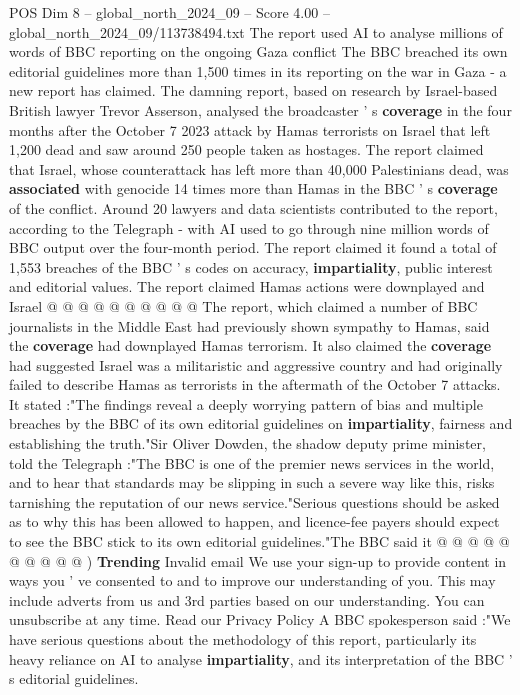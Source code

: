 \begin{textsample}{POS Dim 8 – global\_north\_2024\_09 – Score 4.00 – global\_north\_2024\_09/113738494.txt}  \label{ex:f8_pos_293}
The report used AI to analyse millions of words of BBC reporting on the ongoing Gaza conflict The BBC breached its own editorial guidelines more than 1,500 times in its reporting on the war in Gaza - a new report has claimed.
The damning report, based on research by Israel-based British lawyer Trevor Asserson, analysed the broadcaster ' s \textbf{coverage} in the four months after the October 7 2023 attack by Hamas terrorists on Israel that left 1,200 dead and saw around 250 people taken as hostages.
The report claimed that Israel, whose counterattack has left more than 40,000 Palestinians dead, was \textbf{associated} with genocide 14 times more than Hamas in the BBC ' s \textbf{coverage} of the conflict.
Around 20 lawyers and data scientists contributed to the report, according to the Telegraph - with AI used to go through nine million words of BBC output over the four-month period.
The report claimed it found a total of 1,553 breaches of the BBC ' s codes on accuracy, \textbf{impartiality}, public interest and editorial values.
The report claimed Hamas actions were downplayed and Israel @ @ @ @ @ @ @ @ @ @ The report, which claimed a number of BBC journalists in the Middle East had previously shown sympathy to Hamas, said the \textbf{coverage} had downplayed Hamas terrorism.
It also claimed the \textbf{coverage} had suggested Israel was a militaristic and aggressive country and had originally failed to describe Hamas as terrorists in the aftermath of the October 7 attacks.
It stated :"The findings reveal a deeply worrying pattern of bias and multiple breaches by the BBC of its own editorial guidelines on \textbf{impartiality}, fairness and establishing the truth."Sir Oliver Dowden, the shadow deputy prime minister, told the Telegraph :"The BBC is one of the premier news services in the world, and to hear that standards may be slipping in such a severe way like this, risks tarnishing the reputation of our news service."Serious questions should be asked as to why this has been allowed to happen, and licence-fee payers should expect to see the BBC stick to its own editorial guidelines."The BBC said it @ @ @ @ @ @ @ @ @ @ ) \textbf{Trending} Invalid email We use your sign-up to provide content in ways you ' ve consented to and to improve our understanding of you.
This may include adverts from us and 3rd parties based on our understanding.
You can unsubscribe at any time.
Read our Privacy Policy A BBC spokesperson said :"We have serious questions about the methodology of this report, particularly its heavy reliance on AI to analyse \textbf{impartiality}, and its interpretation of the BBC ' s editorial guidelines.

\end{textsample}
